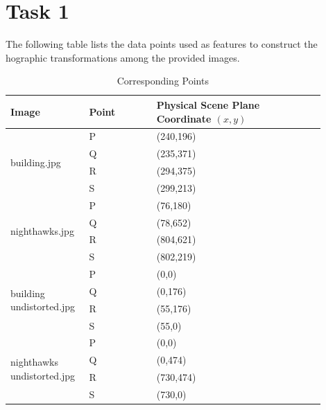 \documentclass{article}
\begin{document}
\section{Task 1}
The following table lists the data points used as features to construct the hographic transformations among the provided images.
\begin{table}[!htbp]
  \caption{Corresponding Points}
    \begin{tabular}{p{0.20\linewidth}p{0.20\linewidth}p{0.50\linewidth}}
        \toprule
        \textbf{Image} & \textbf{Point} & \textbf{Physical Scene Plane Coordinate $(x, y)$}\\
        \midrule
    	\multirow{4}{*}{building.jpg}& P & (240,196) \\
    	& Q & (235,371) \\ & R & (294,375) \\ & S & (299,213)\\
    	\hline
    	\multirow{4}{*}{nighthawks.jpg}& P & (76,180) \\
    	& Q & (78,652) \\ & R & (804,621) \\ & S & (802,219)\\
    	\hline
    	\multirow{4}{*}{building undistorted.jpg}& P & (0,0) \\
    	& Q & (0,176) \\ & R & (55,176) \\ & S & (55,0)\\
    	\hline
    	\multirow{4}{*}{nighthawks undistorted.jpg}& P & (0,0) \\
    	& Q & (0,474) \\ & R & (730,474) \\ & S & (730,0)\\
    	\bottomrule
    \end{tabular}
  \label{tab:conductivities}
\end{table}
\newpage
\end{document}
